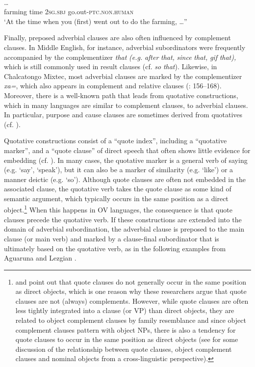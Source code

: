 \documentclass[output=paper]{langsci/langscibook}
\begin{document}
\ea\label{ex:diessel:14}
\\
 …\\
       farming  time   2\textsc{sg.sbj}  go.out-\textsc{ptc.non.human} \\
\glt   `At the time when you (first) went out to do the farming, …”
\z

Finally, preposed adverbial clauses are also often influenced by complement clauses. In Middle English, for instance, adverbial subordinators were frequently accompanied by the complementizer \textit{that} \textit{(e.g.} \textit{after} \textit{that,} \textit{since} \textit{that,} \textit{gif} \textit{that),} which is still commonly used in result clauses (cf. \textit{so} \textit{that}). Likewise, in Chalcatongo Mixtec, most adverbial clauses are marked by the complementizer \textit{xa=}, which also appears in complement and relative clauses (\citealt{Macaulay1996}: 156--168). Moreover, there is a well-known path that leads from quotative constructions, which in many languages are similar to complement clauses, to adverbial clauses. In particular, purpose and cause clauses are sometimes derived from quotatives (cf. \citealt{Güldemann2008}). 

Quotative constructions consist of a “quote index”, including a “quotative marker”, and a “quote clause” of direct speech that often shows little evidence for embedding (cf. \citealt{Güldemann2008}). In many cases, the quotative marker is a general verb of saying (e.g. ‘say’, ‘speak’), but it can also be a marker of similarity (e.g. ‘like’) or a manner deictic (e.g. ‘so’). Although quote clauses are often not embedded in the associated clause, the quotative verb takes the quote clause as some kind of semantic argument, which typically occurs in the same position as a direct object.\footnote{\citet{Munro1982} and \citet{Güldemann2008} point out that quote clauses do not generally occur in the same position as direct objects, which is one reason why these researchers argue that quote clauses are not (always) complements. However, while quote clauses are often less tightly integrated into a clause (or VP) than direct objects, they are related to object complement clauses by family resemblance and since object complement clauses pattern with object NPs, there is also a tendency for quote clauses to occur in the same position as direct objects (see \citealt{Schmidtke-BodeDiessel2017} for some discussion of the relationship between quote clauses, object complement clauses and nominal objects from a cross-linguistic perspective).} When this happens in OV languages, the consequence is that quote clauses precede the quotative verb. If these constructions are extended into the domain of adverbial subordination, the adverbial clause is preposed to the main clause (or main verb) and marked by a clause-final subordinator that is ultimately based on the quotative verb, as in the following examples from Aguaruna  and Lezgian .
\end{document}
